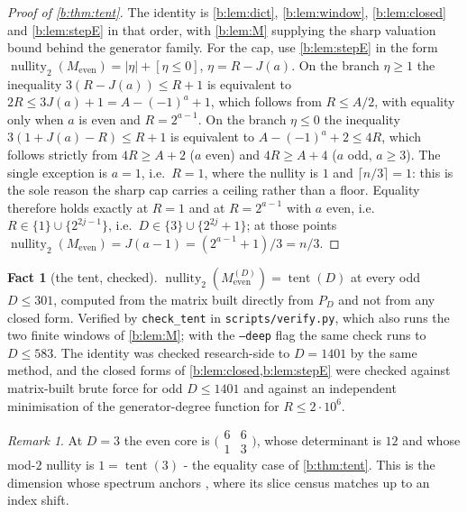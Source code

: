 \documentclass[11pt]{amsart}
\theoremstyle{definition}
\newtheorem{fact}[theorem]{Fact}
\theoremstyle{remark}
\newtheorem{remark}[theorem]{Remark}
\begin{document}
\begin{proof}[Proof of \cref{b:thm:tent}]
The identity is \cref{b:lem:dict}, \cref{b:lem:window}, \cref{b:lem:closed} and \cref{b:lem:stepE} in that order, with \cref{b:lem:M} supplying the sharp valuation bound behind the generator family. For the cap, use \cref{b:lem:stepE} in the form $\operatorname{nullity}_2(M_{\mathrm{even}}) = |\eta| + [\eta \le 0]$, $\eta = R - J(a)$. On the branch $\eta \ge 1$ the inequality $3(R - J(a)) \le R+1$ is equivalent to $2R \le 3J(a)+1 = A - (-1)^a + 1$, which follows from $R \le A/2$, with equality only when $a$ is even and $R = 2^{a-1}$. On the branch $\eta \le 0$ the inequality $3(1 + J(a) - R) \le R+1$ is equivalent to $A - (-1)^a + 2 \le 4R$, which follows strictly from $4R \ge A+2$ ($a$ even) and $4R \ge A+4$ ($a$ odd, $a \ge 3$). The single exception is $a = 1$, i.e.\ $R = 1$, where the nullity is $1$ and $\lceil n/3 \rceil = 1$: this is the sole reason the sharp cap carries a ceiling rather than a floor. Equality therefore holds exactly at $R = 1$ and at $R = 2^{a-1}$ with $a$ even, i.e.\ $R \in \{1\} \cup \{2^{2j-1}\}$, i.e.\ $D \in \{3\} \cup \{2^{2j}+1\}$; at those points $\operatorname{nullity}_2(M_{\mathrm{even}}) = J(a-1) = (2^{a-1}+1)/3 = n/3$.
\end{proof}

\begin{fact}[the tent, checked]
\label{b:fact:tent}
$\operatorname{nullity}_2(M_{\mathrm{even}}^{(D)}) = \operatorname{tent}(D)$ at every odd $D \le 301$, computed from the matrix built directly from $P_D$ and not from any closed form. Verified by \texttt{check\_tent} in \texttt{scripts/verify.py}, which also runs the two finite windows of \cref{b:lem:M}; with the \texttt{--deep} flag the same check runs to $D \le 583$. The identity was checked research-side to $D = 1401$ by the same method, and the closed forms of \cref{b:lem:closed,b:lem:stepE} were checked against matrix-built brute force for odd $D \le 1401$ and against an independent minimisation of the generator-degree function for $R \le 2\cdot 10^{6}$.
\end{fact}

\begin{remark}
At $D = 3$ the even core is $\bigl(\begin{smallmatrix}6&6\\1&3\end{smallmatrix}\bigr)$, whose determinant is $12$ and whose mod-$2$ nullity is $1 = \operatorname{tent}(3)$ - the equality case of \cref{b:thm:tent}. This is the dimension whose spectrum anchors \cite{slice-order}, where its slice census matches \cite{oeisA299916} up to an index shift.
\end{remark}
\end{document}

